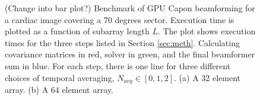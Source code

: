 \documentclass[journal]{IEEEtran}
\begin{document}
\begin{figure}[!t]
\centerline{
\hfil
{}}
\caption{(Change into bar plot?) Benchmark of GPU Capon beamforming for a cardiac image covering a 70 degrees sector. Execution time is plotted as a function of subarray length $L$. The plot shows execution times for the three steps listed in Section \ref{sec:meth}. Calculating covariance matrices in red, solver in green, and the final beamformer sum in blue. For each step, there is one line for three different choices of temporal averaging, $N_{avg} \in [0, 1, 2]$. (a) A 32 element array. (b) A 64 element array.}
\label{fig:bench}
\end{figure}
\end{document}
